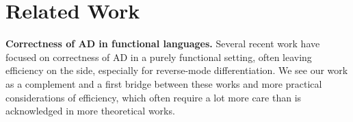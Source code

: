 

\section{Related Work} %
\label{sec:related_work}

\noindent \textbf{Correctness of AD in functional languages.}
Several recent work \cite{huot2020correctness,vakar2020reverse,vakar2020denotational,brunel2019backpropagation,barthe2020versatility,mazza2021automatic,lee2020correctness,abadi-plotkin2020} have focused on correctness of AD in a purely functional setting, 
often leaving efficiency on the side, especially for reverse-mode differentiation. 
We see our work as a complement and a first bridge between these works 
and more practical considerations of efficiency, 
which often require a lot more care than is acknowledged in more theoretical works.


